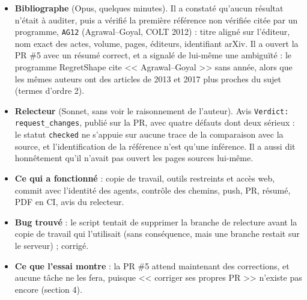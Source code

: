 \documentclass[11pt,a4paper]{article}
\newcommand{\cmd}[1]{\texttt{#1}}
\begin{document}
\begin{itemize}
\item \textbf{Bibliographe} (Opus, quelques minutes). Il a constaté qu'aucun résultat n'était à
  auditer, puis a vérifié la première référence non vérifiée citée par un programme, \cmd{AG12}
  (Agrawal--Goyal, COLT 2012) : titre aligné sur l'éditeur, nom exact des actes, volume, pages,
  éditeurs, identifiant arXiv. Il a ouvert la PR \#5 avec un résumé correct, et a signalé de lui-même
  une ambiguïté : le programme RegretShape cite << Agrawal--Goyal >> sans année, alors que les mêmes
  auteurs ont des articles de 2013 et 2017 plus proches du sujet (termes d'ordre 2).
\item \textbf{Relecteur} (Sonnet, sans voir le raisonnement de l'auteur). Avis
  \cmd{Verdict: request\_changes}, publié sur la PR, avec quatre défauts dont deux sérieux : le statut
  \cmd{checked} ne s'appuie sur aucune trace de la comparaison avec la source, et l'identification de
  la référence n'est qu'une inférence. Il a aussi dit honnêtement qu'il n'avait pas ouvert les pages
  sources lui-même.
\item \textbf{Ce qui a fonctionné} : copie de travail, outils restreints et accès web, commit avec
  l'identité des agents, contrôle des chemins, push, PR, résumé, PDF en CI, avis du relecteur.
\item \textbf{Bug trouvé} : le script tentait de supprimer la branche de relecture avant la copie de
  travail qui l'utilisait (sans conséquence, mais une branche restait sur le serveur) ; corrigé.
\item \textbf{Ce que l'essai montre} : la PR \#5 attend maintenant des corrections, et aucune tâche ne
  les fera, puisque << corriger ses propres PR >> n'existe pas encore (section 4).
\end{itemize}
\end{document}
